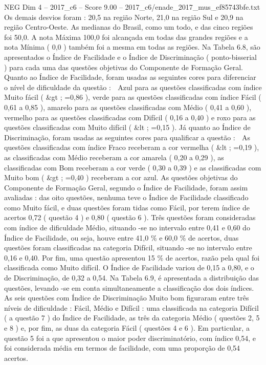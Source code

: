 \begin{textsample}{NEG Dim 4 – 2017\_c6 – Score 9.00 – 2017\_c6/enade\_2017\_mus\_ef85743bfe.txt}
Os demais desvios foram : 20,5 na região Norte, 21,0 na região Sul e 20,9 na região Centro-Oeste.
As medianas do Brasil, como um todo, e das cinco regiões foi 50,0.
A nota Máxima 100,0 foi alcançada em todas das grandes regiões e a nota Mínima ( 0,0 ) também foi a mesma em todas as regiões.
Na Tabela 6.8, são apresentados o Índice de Facilidade e o Índice de Discriminação ( ponto-bisserial ) para cada uma das questões objetivas do Componente de Formação Geral.
Quanto ao Índice de Facilidade, foram usadas as seguintes cores para diferenciar o nível de dificuldade da questão :  Azul para as questões classificadas com índice Muito fácil ( \&gt ; =0,86 ), verde para as questões classificadas com índice Fácil ( 0,61 a 0,85 ), amarelo para as questões classificadas com Médio ( 0,41 a 0,60 ), vermelho para as questões classificadas com Difícil ( 0,16 a 0,40 ) e roxo para as questões classificadas com Muito difícil ( \&lt ; =0,15 ).
Já quanto ao Índice de Discriminação, foram usadas as seguintes cores para qualificar a questão :  As questões classificadas com índice Fraco receberam a cor vermelha ( \&lt ; =0,19 ), as classificadas com Médio receberam a cor amarela ( 0,20 a 0,29 ), as classificadas com Bom receberam a cor verde ( 0,30 a 0,39 ) e as classificadas com Muito bom ( \&gt ; =0,40 ) receberam a cor azul.
As questões objetivas do Componente de Formação Geral, segundo o Índice de Facilidade, foram assim avaliadas : das oito questões, nenhuma teve o Índice de Facilidade classificado como Muito fácil, e duas questões foram tidas como Fácil, por terem índice de acertos 0,72 ( questão 4 ) e 0,80 ( questão 6 ).
Três questões foram consideradas com índice de dificuldade Médio, situando -se no intervalo entre 0,41 e 0,60 do Índice de Facilidade, ou seja, houve entre 41,0 \% e 60,0 \% de acertos, duas questões foram classificadas na categoria Difícil, situando -se no intervalo entre 0,16 e 0,40.
Por fim, uma questão apresentou 15 \% de acertos, razão pela qual foi classificada como Muito difícil.
O Índice de Facilidade variou de 0,15 a 0,80, e o de Discriminação, de 0,32 a 0,54.
Na Tabela 6.9, é apresentada a distribuição das questões, levando -se em conta simultaneamente a classificação dos dois índices.
As seis questões com Índice de Discriminação Muito bom figuraram entre três níveis de dificuldade : Fácil, Médio e Difícil : uma classificada na categoria Difícil ( a questão 7 ) do Índice de Facilidade, as três da categoria Médio ( questões 2, 5 e 8 ) e, por fim, as duas da categoria Fácil ( questões 4 e 6 ).
Em particular, a questão 5 foi a que apresentou o maior poder discriminatório, com índice 0,54, e foi considerada média em termos de facilidade, com uma proporção de 0,54 acertos.

\end{textsample}
